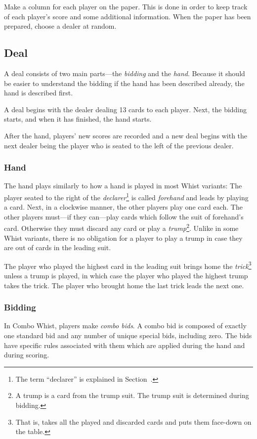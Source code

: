 \documentclass[a4paper]{article}
\begin{document}
	Make a column for each player on the paper. This is done in order to keep track of each player's score and some additional information. When the paper has been prepared, choose a dealer at random.

	\subsection{Deal}
	A deal consists of two main parts---the \emph{bidding} and the \emph{hand}. Because it should be easier to understand the bidding if the hand has been described already, the hand is described first.

	A deal begins with the dealer dealing 13 cards to each player. Next, the bidding starts, and when it has finished, the hand starts.

	After the hand, players' new scores are recorded and a new deal begins with the next dealer being the player who is seated to the left of the previous dealer.

	\subsubsection{Hand}
	The hand plays similarly to how a hand is played in most Whist variants: The player seated to the right of the \emph{declarer}\footnote{The term ``declarer'' is explained in Section~.} is called \emph{forehand} and leads by playing a card. Next, in a clockwise manner, the other players play one card each. The other players must---if they can---play cards which follow the suit of forehand's card. Otherwise they must discard any card or play a \emph{trump}\footnote{A trump is a card from the trump suit. The trump suit is determined during bidding.}. Unlike in some Whist variants, there is no obligation for a player to play a trump in case they are out of cards in the leading suit.

	The player who played the highest card in the leading suit brings home the \emph{trick}\footnote{That is, takes all the played and discarded cards and puts them face-down on the table.} unless a trump is played, in which case the player who played the highest trump takes the trick. The player who brought home the last trick leads the next one.

	\subsubsection{Bidding}
	\label{sec:bidding}
	In Combo Whist, players make \emph{combo bids}. A combo bid is composed of exactly one standard bid and any number of unique special bids, including zero. The bids have specific rules associated with them which are applied during the hand and during scoring.
\end{document}
